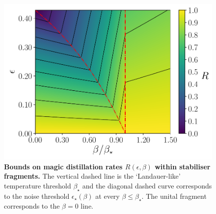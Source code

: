 \documentclass[pra,
aps,
twocolumn,
superscriptaddress,
groupedaddress,
nofootinbib,
reprint
]{revtex4-1}
\begin{document}
\begin{figure}[t!]
    \centering
    \includegraphics[scale=0.55]{figs/rate_scatter.pdf}
    \caption{\textbf{Bounds on magic distillation rates $R(\epsilon, \beta)$ within stabiliser fragments.}
    The vertical dashed line is the `Landauer-like' temperature threshold $\beta_\star$ and the diagonal dashed curve corresponds to the noise threshold $\epsilon_\star (\beta)$ at every $\beta \leq \beta_\star$. The unital fragment corresponds to the $\beta =0 $ line.
    }
    \label{fig:rate_contour}
\end{figure}
\end{document}
